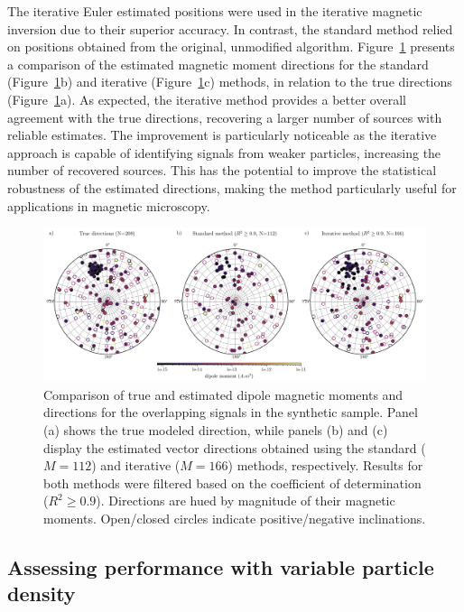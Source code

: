 The iterative Euler estimated positions were used in the iterative magnetic inversion due to their superior accuracy. In contrast, the standard method relied on positions obtained from the original, unmodified algorithm. Figure~\ref{inversion2} presents a comparison of the estimated magnetic moment directions for the standard (Figure~\ref{inversion2}b) and iterative (Figure~\ref{inversion2}c) methods, in relation to the true directions (Figure~\ref{inversion2}a). As expected, the iterative method provides a better overall agreement with the true directions, recovering a larger number of sources with reliable estimates. The improvement is particularly noticeable as the iterative approach is capable of identifying signals from weaker particles, increasing the number of recovered sources. This has the potential to improve the statistical robustness of the estimated directions, making the method particularly useful for applications in magnetic microscopy.


\begin{figure}[tb!]
  \centering
  \includegraphics[width=1\linewidth]{paper/figures/synthetic-data-stereograms-comparison.png}
  \caption{
    Comparison of true and estimated dipole magnetic moments and directions for the overlapping signals in the synthetic sample. Panel (a) shows the true modeled direction, while panels (b) and (c) display the estimated vector directions obtained using the standard ($M = 112$) and iterative ($M = 166$) methods, respectively. Results for both methods were filtered based on the coefficient of determination ($R^2 \geq 0.9$). Directions are hued by magnitude of their magnetic moments. Open/closed circles indicate positive/negative inclinations.
  }
  \label{inversion2}
\end{figure}



\subsection{Assessing performance with variable particle density}

